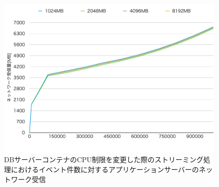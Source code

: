 \documentclass[../../../../../main]{subfiles}
\begin{document}
    \begin{figure}[H]
        \centering
        \includegraphics[width=12cm]{graph}
        \caption{DBサーバーコンテナのCPU制限を変更した際のストリーミング処理におけるイベント件数に対するアプリケーションサーバーのネットワーク受信}
        \label{fig:stream-change-db-cpu-limit-app-net-in-app_4_8192-db_1024}
    \end{figure}
\end{document}
